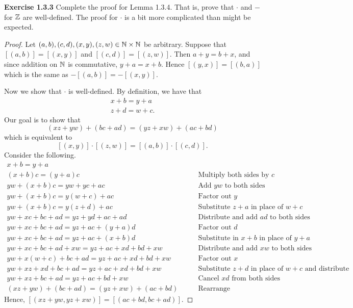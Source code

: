 \newpage

\noindent \textbf{Exercise 1.3.3} Complete the proof for Lemma 1.3.4. That is, prove that \(\cdot\) and \(-\) for \(\mathbb{Z}\) are well-defined. The proof for \(\cdot\) is a bit more complicated
than might be expected.
\begin{proof}
    Let \((a,b), (c,d), (x,y), (z,w) \in \mathbb{N} \times \mathbb{N}\) be arbitrary. Suppose that \([(a,b)] = [(x,y)]\) and \([(c,d)] = [(z,w)]\). Then \(a + y = b+x\), and since addition on \(\mathbb{N}\) is commutative, \(y+a = x+b\).
    Hence \([(y,x)] = [(b,a)]\) which is the same as \(-[(a,b)] = -[(x,y)]\).
    \par Now we show that \(\cdot\) is well-defined. By definition, we have that
    \begin{gather*}
        x+b = y+a \\
        z+d = w + c.
    \end{gather*}
    Our goal is to show that \[(xz + yw) + (bc + ad) = (yz + xw) + (ac + bd)\] which is equivalent to \[[(x,y)] \cdot [(z,w)] = [(a,b)] \cdot [(c,d)].\]
    Consider the following.
    \begin{align*}
        x+b = y+a\\
        (x+b)c = (y+a)c &\qquad \text{Multiply both sides by }c\\
        yw + (x+b)c = yw + yc+ac &\qquad \text{Add }yw\text{ to both sides} \\
        yw + (x+b)c = y(w+c) + ac &\qquad \text{Factor out }y\\
        yw + (x+b)c = y(z+d)+ac &\qquad \text{Substitute }z+a\text{ in place of }w+c\\
        yw + xc + bc + ad = yz + yd + ac + ad &\qquad \text{Distribute and add } ad\text{ to both sides}\\
        yw + xc + bc + ad = yz + ac + (y + a)d &\qquad \text{Factor out }d\\
        yw + xc + bc + ad = yz + ac + (x+b)d &\qquad \text{Substitute in }x+b\text{ in place of }y+a\\
        yw + xc + bc + ad + xw = yz + ac + xd + bd + xw &\qquad \text{Distribute and add }xw\text{ to both sides}\\
        yw + x(w+c) + bc + ad = yz + ac + xd + bd + xw &\qquad \text{Factor out }x\\
        yw + xz+xd + bc + ad = yz + ac + xd + bd + xw &\qquad \text{Substitute }z+d \text{ in place of }w+c \text{ and distribute}\\
        yw + xz + bc + ad = yz + ac + bd + xw &\qquad \text{Cancel }xd \text{ from both sides}\\
        (xz + yw) + (bc + ad) = (yz + xw) + (ac + bd) &\qquad \text{Rearrange}
    \end{align*}
    Hence, \([(xz+yw, yz + xw)] = [(ac + bd, bc + ad)]\).
\end{proof}
